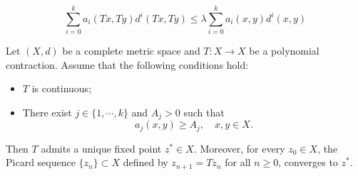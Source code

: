 \documentclass[10pt,a4paper]{amsart}
\begin{document}
\begin{equation}\label{SPC}
\sum_{i=0}^ka_i(Tx,Ty)d^i(Tx,Ty)\leq \lambda \sum_{i=0}^k a_i(x,y)d^i(x,y)	
\end{equation}

\begin{theorem}\label{T2.2}
Let $(X,d)$ be a complete metric space and $T: X\to X$ be a polynomial contraction. Assume that the following conditions hold:
\begin{itemize}
\item[{\rm{(i)}}]$T$ is continuous;
\item[{\rm{(ii)}}] There exist $j\in\{1,\cdots,k\}$ and 	$A_j>0$ such that 
$$
a_j(x,y)\geq A_j,\quad x,y\in X.
$$
\end{itemize}
Then $T$ admits a unique fixed point $z^*\in X$. Moreover, for every $z_0\in X$, the Picard sequence  $\{z_n\}\subset X$ defined by $z_{n+1}=Tz_n$ for all $n\geq 0$, converges to $z^*$. 
\end{theorem}
\end{document}
